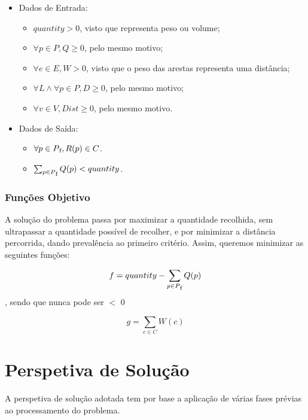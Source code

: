 \documentclass[article, a4paper, 12pt, oneside]{memoir}
\begin{document}
\begin{itemize}

\item Dados de Entrada:

	\begin{itemize}
	\item $quantity > 0$, visto que representa peso ou volume;
	\item $\forall  p \in P, Q \geq 0$, pelo mesmo motivo;
	\item $\forall  e \in E, W > 0$, visto que o peso das arestas representa uma distância;
	\item $\forall L \land \forall p \in P, D \geq 0$, pelo mesmo motivo;
	\item $\forall v \in V, Dist \geq 0$, pelo mesmo motivo.
	\end{itemize}
	
\item Dados de Saída:

	\begin{itemize}
	\item $\forall p \in P\textsubscript{f}, R(p) \in C$.
	\item $\sum_{p \in P\textsubscript{f}} Q(p) < quantity$.
	\end{itemize}

\end{itemize}

\subsection{Funções Objetivo}

A solução do problema passa por maximizar a quantidade recolhida, sem ultrapassar a quantidade possível de recolher, e por minimizar a distância percorrida, dando prevalência ao primeiro critério. Assim, queremos minimizar as seguintes funções:

$$f = quantity - \sum_{p \in P\textsubscript{f}} Q(p)$$, sendo que nunca pode ser $<$ 0

$$g = \sum_{c \in C} W(c)$$

\newpage
\chapter[Perspetiva de Solução][Perspetiva de Solução]{Perspetiva de Solução} \label{\thechapter}
A perspetiva de solução adotada tem por base a aplicação de várias fases prévias ao processamento do problema.
\end{document}
